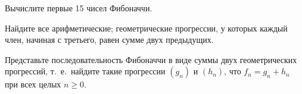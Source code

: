 \documentclass[a4paper,12pt]{article}
\begin{document}
 Вычислите первые 15 чисел Фибоначчи.


 Найдите все
арифметические;
геометрические прогрессии, у которых каждый член,
начиная с третьего, равен сумме двух предыдущих.


Представьте последовательность Фибоначчи в виде
суммы двух геометрических прогрессий,
т.~е.~найдите такие прогрессии $(g_n)$ и $(h_n)$, что $f_n=g_n+h_n$ при
всех целых $n\geq0$.  %

\vspace*{-2mm}
\end{document}

